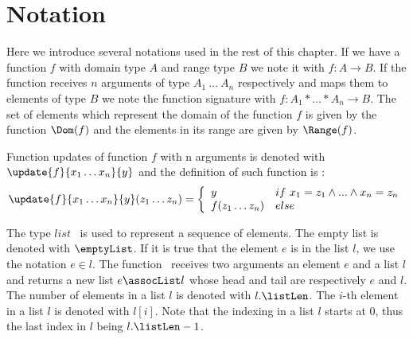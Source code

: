 
 \section{Notation}\label{notation}
 Here we introduce several notations used in the rest of this chapter.
 If we have a function $f$ with  domain type  $A$ and range type $B$
 we note it with $f : A \rightarrow B$. If the function receives $n$ arguments of type $A_1 \ \ldots \ A_n$ respectively
 and maps them to elements of type $B$
 we note the function signature with $f : A_1 * ...*A_n \rightarrow B$.
 The set of elements which  represent the domain of the  function $f$
 is given by the function $\Dom(f)$ and the elements in its range are given
 by $\Range(f)$. 

 Function updates of function $f$ with n arguments is denoted with $ \update{f}{x_1 \ldots x_n}{y} $ and the definition of such function is :
 $$  \update{f}{x_1 \ldots x_n }{y}(z_1 \ldots z_n) = 
    \left\{\begin{array}{ll}
                  y & if \ x_1 = z_1 \wedge ...\wedge x_n = z_n \\
		  f(z_1 \ldots z_n ) & else
           \end{array}\right.$$
 

 The type $list$ \ is used to represent a sequence of elements. The empty list is denoted with $\emptyList$.
 If it is true that the element $e$ is in the  list $l$, we use the notation $e \in l$.
 The function \assocList \ receives two arguments an element $e$ and a list $l$ and returns a new list 
 $e \assocList l$ whose head and tail are respectively $e$ and $l$. The number of elements in a list $l$ is denoted with  $l.\listLen$.
 The $i$-th element in a list $l$  is denoted with $l[i]$. Note that the indexing in a list $l$ starts at $0$, thus the last
 index in  $l$ being $l.\listLen - 1$.




 
